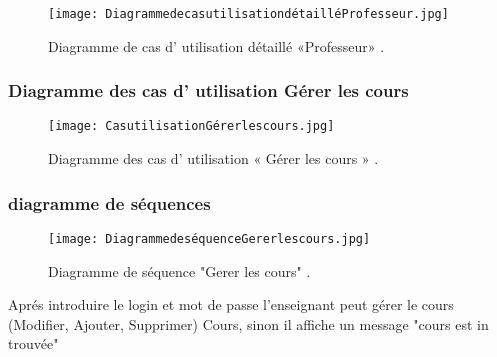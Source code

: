 \begin{figure}[ht]
	\centering
	\texttt{[image: DiagrammedecasutilisationdétailléProfesseur.jpg]}
	\caption{Diagramme de cas d' utilisation  détaillé «Professeur» .}
	\label{fig:Diagramme de cas d' utilisation  détaillé Professeur  }
\end{figure}


\subsubsection{Diagramme des cas d' utilisation  Gérer les cours }
\begin{figure}[ht]
	\centering
	\texttt{[image: CasutilisationGérerlescours.jpg]}
	\caption{Diagramme des cas d' utilisation « Gérer les cours » .}
	\label{fig:Diagramme des cas d' utilisation  Gérer les cours  }
\end{figure}
\FloatBarrier

\clearpage


\subsubsection{diagramme de séquences }
\begin{figure}[ht]
	\centering
	\texttt{[image: DiagrammedeséquenceGererlescours.jpg]}
	\caption{Diagramme de séquence "Gerer les cours" .}
	\label{fig:Diagramme de séquence "Gerer les cours"  }
\end{figure}
\FloatBarrier
Aprés introduire le login et mot de passe l’enseignant peut gérer le cours (Modifier, Ajouter,
Supprimer) Cours, sinon il affiche un message "cours est in trouvée"


